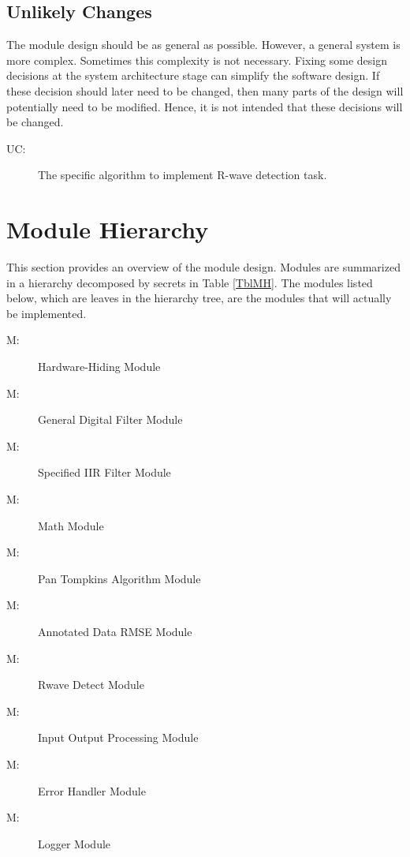 \documentclass[12pt, titlepage]{article}
\newcounter{ucnum}
\newcommand{\uctheucnum}{UC\theucnum}
\newcounter{mnum}
\newcommand{\mthemnum}{M\themnum}
\begin{document}
\subsection{Unlikely Changes} \label{SecUchange}

The module design should be as general as possible. However, a general system is
more complex. Sometimes this complexity is not necessary. Fixing some design
decisions at the system architecture stage can simplify the software design. If
these decision should later need to be changed, then many parts of the design
will potentially need to be modified. Hence, it is not intended that these
decisions will be changed.

\begin{description}
\item[ \uctheucnum \label{ucAlg}:] The specific algorithm
to implement R-wave detection task.
\end{description}

\section{Module Hierarchy} \label{SecMH}

This section provides an overview of the module design. Modules are summarized
in a hierarchy decomposed by secrets in Table \ref{TblMH}. The modules listed
below, which are leaves in the hierarchy tree, are the modules that will
actually be implemented.

\begin{description}
\item [ \mthemnum \label{mHH}:] Hardware-Hiding Module
\item [ \mthemnum \label{mGDF}:] General Digital Filter
Module
\item [ \mthemnum \label{mSIIR}:] Specified IIR Filter
Module
\item [ \mthemnum \label{mMath}:] Math Module
\item [ \mthemnum \label{mAlg}:] Pan Tompkins Algorithm
Module
\item [ \mthemnum \label{mRMSE}:] Annotated Data RMSE
Module
\item [ \mthemnum \label{mRwave}:] Rwave Detect Module
\item [ \mthemnum \label{mIO}:] Input Output Processing
Module
\item [ \mthemnum \label{mError}:] Error Handler Module
\item [ \mthemnum \label{mLogger}:] Logger Module
\end{description}
\end{document}

